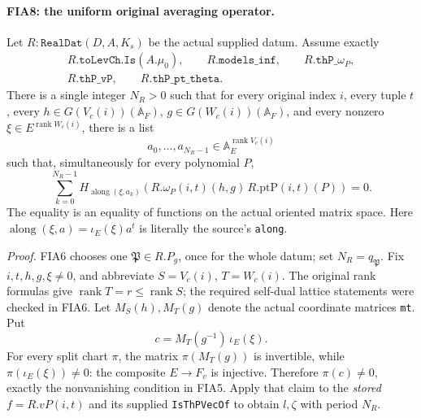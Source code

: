 \paragraph{FIA8: the uniform original averaging operator.}
\label{claim:FIA8}
Let \(R:\texttt{RealDat}(D,A,K_s)\) be the actual supplied
datum.  Assume exactly
\[
 \begin{gathered}
 R.\texttt{toLevCh.Is}(A.\mu_0),\qquad R.\texttt{models\_inf},
 \qquad R.\texttt{thP\_}\omega_P,\\
 R.\texttt{thP\_vP},\qquad R.\texttt{thP\_pt\_theta}.
 \end{gathered}                                                    \tag{FIA.39}
\]
There is a single integer \(N_R>0\) such that for every
original index \(i\), every tuple \(t\), every
\(h\in G(V_c(i))(\mathbb A_F)\),
\(g\in G(W_c(i))(\mathbb A_F)\), and every nonzero
\(\xi\in E^{\operatorname{rank}W_c(i)}\), there is a list
\[
       a_0,\ldots,a_{N_R-1}\in
                   \mathbb A_E^{\operatorname{rank}V_c(i)}
 \tag{FIA.40}
\]
such that, simultaneously for every polynomial \(P\),
\[
 \sum_{k=0}^{N_R-1}
 H_{\operatorname{along}(\xi,a_k)}
       \left(R.\omega_P(i,t)(h,g)\,
                        R.\mathrm{ptP}(i,t)(P)\right)=0 .
 \tag{FIA.41}
\]
The equality is an equality of functions on the actual
oriented matrix space.  Here
\(\operatorname{along}(\xi,a)=\iota_E(\xi)a^t\)
is literally the source's \texttt{along}.

\emph{Proof.}
FIA6 chooses one \(\mathfrak P\in R.P_g\), once for the
whole datum; set \(N_R=q_{\mathfrak P}\).
Fix \(i,t,h,g,\xi\ne0\), and abbreviate
\(S=V_c(i)\), \(T=W_c(i)\).
The original rank formulas give
\(\operatorname{rank}T=r\le\operatorname{rank}S\);
the required self-dual lattice statements were checked in FIA6.
Let \(M_S(h),M_T(g)\) denote the actual coordinate matrices
\texttt{mt}.  Put
\[
                   c=M_T(g^{-1})\,\iota_E(\xi).
 \tag{FIA.42}
\]
For every split chart \(\pi\), the matrix \(\pi(M_T(g))\)
is invertible, while \(\pi(\iota_E(\xi))\ne0\):
the composite \(E\to F_v\) is injective.
Therefore \(\pi(c)\ne0\), exactly the nonvanishing condition
in FIA5.
Apply that claim to the \emph{stored}
\(f=R.vP(i,t)\) and its supplied \texttt{IsThPVecOf}
to obtain \(l,\zeta\) with period \(N_R\).

